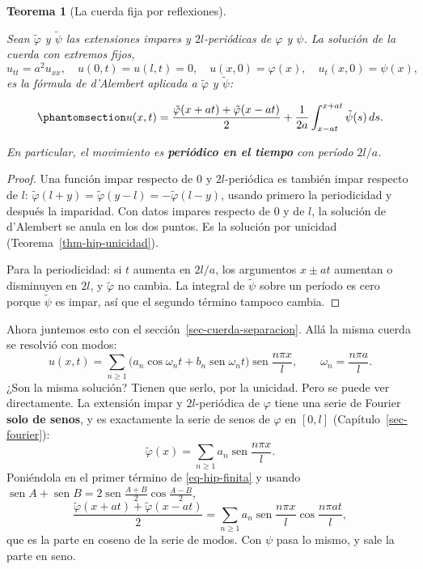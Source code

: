 \documentclass[
  spanish,
  a4paper,
]{scrbook}
\theoremstyle{definition}
\theoremstyle{plain}
\theoremstyle{definition}
\theoremstyle{plain}
\newtheorem{theorem}{Teorema}[chapter]
\theoremstyle{definition}
\theoremstyle{remark}
\begin{document}
\begin{theorem}[La cuerda fija por
reflexiones]\protect\hypertarget{thm-hip-finita}{}\label{thm-hip-finita}

Sean \(\tilde\varphi\) y \(\tilde\psi\) las extensiones impares y
\(2l\)-periódicas de \(\varphi\) y \(\psi\). La solución de la cuerda
con extremos fijos,
\[u_{tt} = a^2u_{xx},\quad u(0,t) = u(l,t) = 0,\quad u(x,0) = \varphi(x),\quad u_t(x,0) = \psi(x),\]
es la fórmula de d'Alembert aplicada a \(\tilde\varphi\) y
\(\tilde\psi\):

\begin{equation}\protect\phantomsection\label{eq-hip-finita}{
u(x,t) = \frac{\tilde\varphi(x+at)+\tilde\varphi(x-at)}{2} + \frac{1}{2a}\int_{x-at}^{x+at}\tilde\psi(s)\,ds .
}\end{equation}

En particular, el movimiento es \textbf{periódico en el tiempo} con
período \(2l/a\).

\end{theorem}

\begin{proof}
Una función impar respecto de \(0\) y \(2l\)-periódica es también impar
respecto de \(l\):
\(\tilde\varphi(l+y) = \tilde\varphi(y-l) = -\tilde\varphi(l-y)\),
usando primero la periodicidad y después la imparidad. Con datos impares
respecto de \(0\) y de \(l\), la solución de d'Alembert se anula en los
dos puntos. Es la solución por unicidad
(Teorema~\ref{thm-hip-unicidad}).

Para la periodicidad: si \(t\) aumenta en \(2l/a\), los argumentos
\(x\pm at\) aumentan o disminuyen en \(2l\), y \(\tilde\varphi\) no
cambia. La integral de \(\tilde\psi\) sobre un período es cero porque
\(\tilde\psi\) es impar, así que el segundo término tampoco cambia.
\end{proof}

Ahora juntemos esto con el sección~\ref{sec-cuerda-separacion}. Allá la
misma cuerda se resolvió con modos: \[
u(x,t) = \sum_{n\ge1}\Big(a_n\cos\omega_nt + b_n\operatorname{sen}\omega_nt\Big)\operatorname{sen}\frac{n\pi x}{l},
\qquad \omega_n = \frac{n\pi a}{l}.
\] ¿Son la misma solución? Tienen que serlo, por la unicidad. Pero se
puede ver directamente. La extensión impar y \(2l\)-periódica de
\(\varphi\) tiene una serie de Fourier \textbf{solo de senos}, y es
exactamente la serie de senos de \(\varphi\) en \([0,l]\)
(Capítulo~\ref{sec-fourier}): \[
\tilde\varphi(x) = \sum_{n\ge1} a_n \operatorname{sen}\frac{n\pi x}{l}.
\] Poniéndola en el primer término de \ref{eq-hip-finita} y usando
\(\operatorname{sen}A + \operatorname{sen}B = 2\operatorname{sen}\tfrac{A+B}{2}\cos\tfrac{A-B}{2}\),
\[
\frac{\tilde\varphi(x+at)+\tilde\varphi(x-at)}{2} = \sum_{n\ge1} a_n\operatorname{sen}\frac{n\pi x}{l}\cos\frac{n\pi at}{l},
\] que es la parte en coseno de la serie de modos. Con \(\psi\) pasa lo
mismo, y sale la parte en seno.
\end{document}
